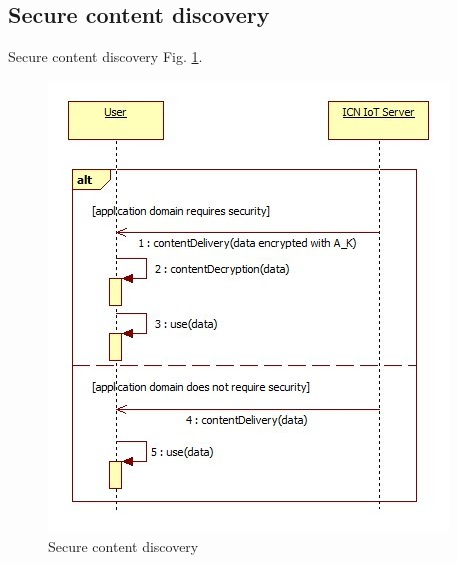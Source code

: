 \subsection{Secure content discovery}
Secure content discovery Fig. \ref{fig:Secure content discovery}.
 \begin{figure}[h]
	\centering
	\includegraphics[width=0.8\linewidth]{Figures/Secure-content-delivery-user.png}
	\caption[]{Secure content discovery}
	\label{fig:Secure content discovery}
\end{figure}
\par
